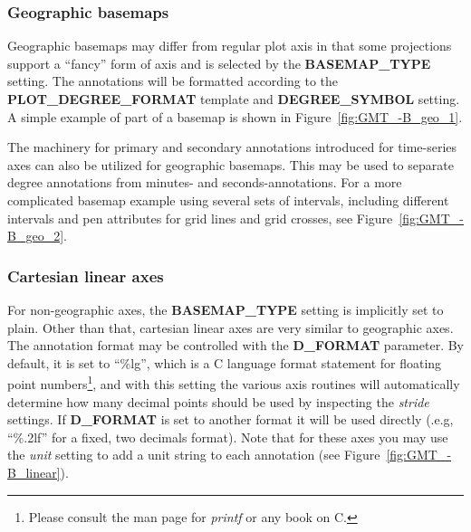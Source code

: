 \subsubsection{Geographic basemaps}

Geographic basemaps may differ from regular plot axis in that some projections support a
``fancy'' form of axis and is selected by the \textbf{BASEMAP\_TYPE} setting.  The annotations
will be formatted according to the \textbf{PLOT\_DEGREE\_FORMAT} template and \textbf{DEGREE\_SYMBOL}
setting.  A simple example of part of a basemap is shown in Figure~\ref{fig:GMT_-B_geo_1}.


The machinery for primary and secondary annotations introduced for time-series axes can
also be utilized for geographic basemaps.  This may be used to separate
degree annotations from minutes- and seconds-annotations.  For a more complicated basemap
example using several sets of intervals, including different intervals and pen attributes
for grid lines and grid crosses, see Figure~\ref{fig:GMT_-B_geo_2}.



\subsubsection{Cartesian linear axes}

For non-geographic axes, the \textbf{BASEMAP\_TYPE} setting is implicitly set to plain.  Other than that,
cartesian linear axes are very similar to geographic axes.  The annotation format may be controlled with
the \textbf{D\_FORMAT} parameter.  By default, it is set to ``\%lg'', which is a C language format statement
for floating point numbers\footnote{Please consult the man page for \emph{printf} or any book on C.},
and with this setting the various axis routines will automatically determine
how many decimal points should be used by inspecting the \emph{stride} settings.  If \textbf{D\_FORMAT} is set
to another format it will be used directly (.e.g, ``\%.2lf'' for a fixed, two decimals format).
Note that for these axes you may use the \emph{unit} setting to
add a unit string to each annotation (see Figure~\ref{fig:GMT_-B_linear}).

